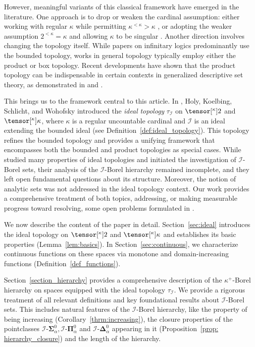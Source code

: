 \documentclass{amsart}
\numberwithin{equation}{section}
\newcommand{\I}{\mathcal{I}}
\newcommand{\pre}[2]{\tensor[^{#1}]{#2}{}}
\newcommand{\1}{\mathbf{I}}
\newcommand{\2}{\mathbf{II}}
\newcommand{\Siid}[2]{\I\text{-}\boldsymbol{\Sigma}^{ #1 }_{ #2}}
\newcommand{\Piid}[2]{\I\text{-}\boldsymbol{\Pi}^{ #1 }_{ #2 }}
\newcommand{\Deid}[2]{\I\text{-}\boldsymbol{\Delta}^{ #1 }_{ #2}}
\renewcommand{\a}{\alpha}
\theoremstyle{definition}
\theoremstyle{remark}
\begin{document}
However, meaningful variants of this classical framework have emerged in the literature. One approach is to drop or weaken the cardinal assumption: either working with regular \(\kappa\) while permitting  \(\kappa^{<\kappa}>\kappa\) \cite{HMV}, or adopting the weaker assumption \(2^{<\kappa}=\kappa\) and allowing \(\kappa\) to be singular \cite{AMR, DM, ACMRP,MRP25}. Another direction involves changing the topology itself. While papers on infinitary logics predominantly use the bounded topology, works in general topology \cite{ Kur66, Unl82, Kra01, Ili12, CK13} typically employ either the product or box topology. Recent developments have shown that the product topology can be indispensable in certain contexts in generalized descriptive set theory, as demonstrated in \cite[Sections 12 and 13]{AMR} and \cite[Sections 5 and 6]{DM}.

This brings us to the framework central to this article. In \cite{HKSW22}, Holy, Koelbing, Schlicht, and Wohofsky introduced the \emph{ideal topology} \(\tau_\I\) on \(\pre{\kappa}{2}\) and \(\pre{\kappa}{\kappa}\), where \(\kappa\) is a regular uncountable cardinal and \(\I\) is an ideal extending the bounded ideal (see Definition~\ref{def:ideal_topology}). 
This topology refines the bounded topology and provides a unifying framework that encompasses both the bounded and product topologies as special cases. 
While \cite{HKSW22} studied many properties of ideal topologies and initiated the investigation of \(\I\)-Borel sets, their analysis of the \(\I\)-Borel hierarchy remained incomplete, and they left open fundamental questions about its structure. 
Moreover, the notion of analytic sets was not addressed in the ideal topology context. 
Our work provides a comprehensive treatment of both topics, addressing, or making measurable progress toward resolving, some open problems formulated in \cite{HKSW22}.

We now describe the content of the paper in detail. Section~\ref{sec:ideal} introduces the ideal topology on \(\pre{\kappa}{2}\) and \(\pre{\kappa}{\kappa}\) and establishes its basic properties (Lemma~\ref{lem:basics}). In Section~\ref{sec:continuous}, we characterize continuous functions on these spaces via monotone and domain-increasing functions (Definition~\ref{def_functions}).

Section~\ref{section_hierarchy} provides a comprehensive description of the \(\kappa^+\)-Borel hierarchy on spaces equipped with the ideal topology \(\tau_\I\). 
We provide a rigorous treatment of all relevant definitions and key foundational results about \(\I\)-Borel sets. 
This includes natural features of the \(\I\)-Borel hierarchy, like the property of being increasing (Corollary~\ref{thrm:increasing}), the closure properties of the pointclasses \(\Siid{0}{\a}, \Piid{0}{\a}\) and \(\Deid{0}{\a}\) appearing in it (Proposition~\ref{prop: hierarchy_closure}) and the length of the hierarchy. 
\end{document}
